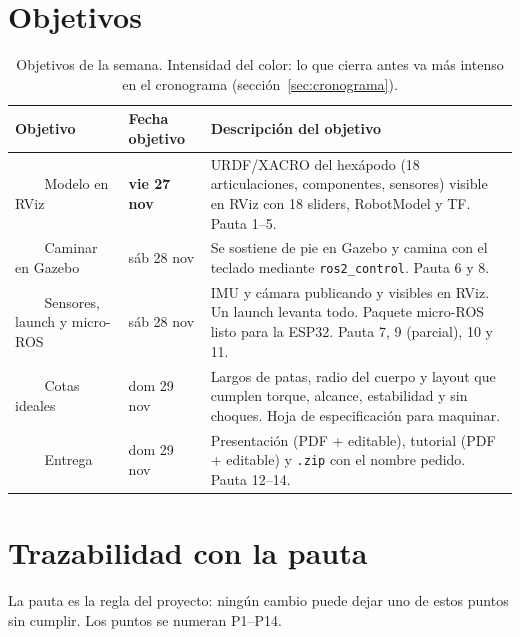 \documentclass[11pt,a4paper]{article}
\newcommand{\pill}[2]{{\setlength{\fboxsep}{1.6pt}\colorbox{#1}{\textcolor{white}{\footnotesize\bfseries\,#2\,}}}}
\begin{document}
\section{Objetivos}

\begin{table}[H]
\centering
\begin{tabularx}{\linewidth}{@{}l l Y@{}}
\toprule
\textbf{Objetivo} & \textbf{Fecha objetivo} & \textbf{Descripción del objetivo}\\
\midrule
\pill{cModelo}{O1} Modelo en RViz & \textbf{vie 27 nov} & URDF/XACRO del hexápodo (18 articulaciones, componentes, sensores) visible en RViz con 18 sliders, RobotModel y TF. Pauta 1--5.\\
\pill{cSim}{O2} Caminar en Gazebo & sáb 28 nov & Se sostiene de pie en Gazebo y camina con el teclado mediante \texttt{ros2\_control}. Pauta 6 y 8.\\
\pill{cSens}{O3} Sensores, launch y micro-ROS & sáb 28 nov & IMU y cámara publicando y visibles en RViz. Un launch levanta todo. Paquete micro-ROS listo para la ESP32. Pauta 7, 9 (parcial), 10 y 11.\\
\pill{cEstudio}{O4} Cotas ideales & dom 29 nov & Largos de patas, radio del cuerpo y layout que cumplen torque, alcance, estabilidad y sin choques. Hoja de especificación para maquinar.\\
\pill{cEntrega}{O5} Entrega & dom 29 nov & Presentación (PDF + editable), tutorial (PDF + editable) y \texttt{.zip} con el nombre pedido. Pauta 12--14.\\
\bottomrule
\end{tabularx}
\caption{Objetivos de la semana. Intensidad del color: lo que cierra antes va más intenso en el cronograma (sección~\ref{sec:cronograma}).}
\end{table}

\section{Trazabilidad con la pauta}

La pauta es la regla del proyecto: ningún cambio puede dejar uno de estos puntos sin cumplir. Los puntos se numeran P1--P14.
\end{document}
